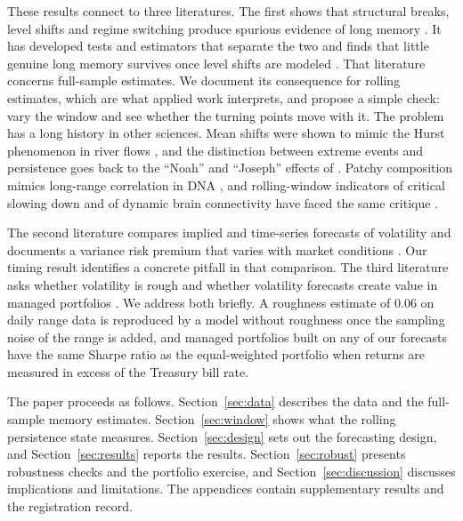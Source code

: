 These results connect to three literatures. The first shows that structural
breaks, level shifts and regime switching produce spurious evidence of long
memory \citep{diebold2001long, granger2004occasional,
mikosch2004nonstationarities, smith2005level, perron2010long}. It has
developed tests and estimators that separate the two \citep{qu2011test,
hou2014modified} and finds that little genuine long memory survives once
level shifts are modeled \citep{varneskov2018combining}. That literature
concerns full-sample estimates. We document its consequence for rolling
estimates, which are what applied work interprets, and propose a simple
check: vary the window and see whether the turning points move with it. The
problem has a long history in other sciences. Mean shifts were shown to
mimic the Hurst phenomenon in river flows \citep{klemes1974hurst}, and the
distinction between extreme events and persistence goes back to the
``Noah'' and ``Joseph'' effects of \citet{mandelbrot1968noah}. Patchy
composition mimics long-range correlation in DNA
\citep{karlin1993patchiness}, and rolling-window indicators of critical
slowing down and of dynamic brain connectivity have faced the same critique
\citep{dakos2008slowing, ditlevsen2010tipping, boettiger2012quantifying,
leonardi2015spurious}.

The second literature compares implied and time-series forecasts of
volatility \citep{christensen1998relation, fleming1998quality,
blair2001forecasting, busch2011role} and documents a variance risk premium
that varies with market conditions \citep{bates2000post, chernov2007role,
bekaert2014vix, andersen2015risk}. Our timing result identifies a concrete
pitfall in that comparison. The third literature asks whether volatility is
rough \citep{gatheral2018volatility, fukasawa2022consistent, cont2024rough}
and whether volatility forecasts create value in managed portfolios
\citep{moreira2017volatility, cederburg2020volatility,
barroso2021volatility}. We address both briefly. A roughness estimate of
0.06 on daily range data is reproduced by a model without roughness once the
sampling noise of the range is added, and managed portfolios built on any of
our forecasts have the same Sharpe ratio as the equal-weighted portfolio when
returns are measured in excess of the Treasury bill rate.

The paper proceeds as follows. Section~\ref{sec:data} describes the data
and the full-sample memory estimates. Section~\ref{sec:window} shows what
the rolling persistence state measures. Section~\ref{sec:design} sets out
the forecasting design, and Section~\ref{sec:results} reports the results.
Section~\ref{sec:robust} presents robustness checks and the portfolio
exercise, and Section~\ref{sec:discussion} discusses implications and
limitations. The appendices contain supplementary results and the
registration record.

